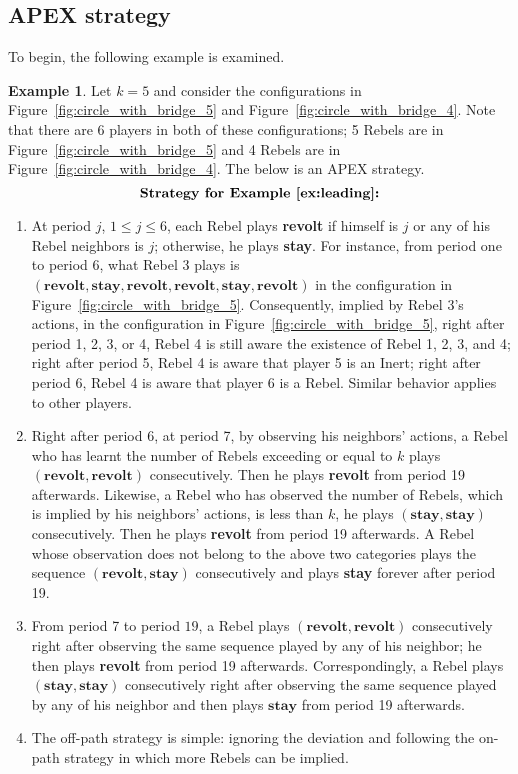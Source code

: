 \documentclass[12pt,letter]{article}
\theoremstyle{definition}
\newtheorem{example}{Example}
\theoremstyle{remark}
\theoremstyle{claim}
\begin{document}
\subsection{APEX strategy}
\label{sec:apex_strategy}
To begin, the following example is examined.
\begin{example}
\label{ex:leading}
Let $k=5$ and consider the configurations in Figure~\ref{fig:circle_with_bridge_5} and Figure~\ref{fig:circle_with_bridge_4}. Note that there are 6 players in both of these configurations; 5 Rebels are in Figure~\ref{fig:circle_with_bridge_5} and 4 Rebels are in Figure~\ref{fig:circle_with_bridge_4}. The below is an APEX strategy.
\[\textbf{Strategy for Example~\ref{ex:leading}:}\]
\begin{enumerate}
\item At period $j$, $1\leq j \leq 6$, each Rebel plays \textbf{revolt} if himself is $j$ or any of his Rebel neighbors is $j$; otherwise, he plays \textbf{stay}. 
For instance, from period one to period 6, what Rebel 3 plays is $(\textbf{revolt},\textbf{stay},\textbf{revolt}, \textbf{revolt},\textbf{stay}, \textbf{revolt})$ in the configuration in Figure~\ref{fig:circle_with_bridge_5}. Consequently, implied by Rebel 3's actions, in the configuration in Figure~\ref{fig:circle_with_bridge_5}, right after period 1, 2, 3, or 4, Rebel 4 is still aware the existence of Rebel 1, 2, 3, and 4; right after period 5, Rebel 4 is aware that player 5 is an Inert; right after period 6, Rebel 4 is aware that player 6 is a Rebel. Similar behavior applies to other players. 
\item Right after period 6, at period 7, by observing his neighbors' actions, a Rebel who has learnt the number of Rebels exceeding or equal to $k$ plays $(\textbf{revolt},\textbf{revolt})$ consecutively. Then he plays \textbf{revolt} from period 19 afterwards. Likewise, a Rebel who has observed the number of Rebels, which is implied by his neighbors' actions, is less than $k$, he plays $(\textbf{stay},\textbf{stay})$ consecutively. Then he plays \textbf{revolt} from period 19 afterwards. A Rebel whose observation does not belong to the above two categories plays the sequence $(\textbf{revolt},\textbf{stay})$ consecutively and plays \textbf{stay} forever after period 19. 
\item From period 7 to period $19$, a Rebel plays $(\textbf{revolt},\textbf{revolt})$ consecutively right after observing the same sequence played by any of his neighbor; he then plays \textbf{revolt} from period 19 afterwards. Correspondingly, a Rebel plays $(\textbf{stay},\textbf{stay})$ consecutively right after observing the same sequence played by any of his neighbor and then plays $\textbf{stay}$ from period 19 afterwards. 
\item The off-path strategy is simple: ignoring the deviation and following the on-path strategy in which more Rebels can be implied. 
\end{enumerate}


\end{example}
\end{document}
